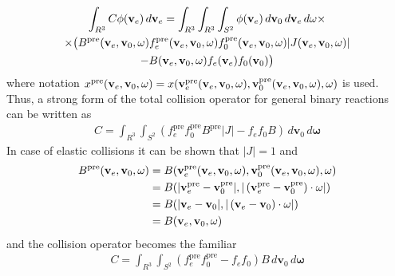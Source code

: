 \documentclass{article}
\newcommand{\diff}[1]{\, d#1}
\newcommand{\vect}[1]{\mathbf{#1}}
\newcommand{\of}[1]{\mleft( #1 \mright)}
\begin{document}
\begin{multline*}
\int_{R^3} C \phi\of{\vect{v}_e} \diff{\vect{v}_e} 
=
\int_{R^3} \int_{R^3} \int_{S^2} 
\phi\of{\vect{v}_e} 
\diff{\vect{v}_0} \diff{\vect{v}_e} \diff{\vect{\omega}}
\times
\\
\times
\big(
B^\text{pre}\of{\vect{v}_e, \vect{v}_0, \vect{\omega}}  
f_e^\text{pre}\of{\vect{v}_e, \vect{v}_0, \vect{\omega}}
f_0^\text{pre}\of{\vect{v}_e, \vect{v}_0, \vect{\omega}} 
|J\of{\vect{v}_e, \vect{v}_0, \vect{\omega}}|
\\
-
B\of{\vect{v}_e, \vect{v}_0, \vect{\omega}} 
f_e\of{\vect{v}_e} f_0\of{\vect{v}_0} 
\big)
\end{multline*}
where notation $x^\text{pre}\of{\vect{v}_e, \vect{v}_0, \vect{\omega}} = x\of{\vect{v}_e^\text{pre} \of{\vect{v}_e, \vect{v}_0, \vect{\omega}}, \vect{v}_0^\text{pre} \of{\vect{v}_e, \vect{v}_0, \vect{\omega}}, \vect{\omega}}$ is used. Thus, a strong form of the total collision operator for general binary reactions can be written as
\begin{align*}
C = 
\int_{R^3} \int_{S^2} 
\left(
f_e^\text{pre}
f_0^\text{pre}
B^\text{pre} 
|J|
-
f_e
f_0
B
\right)
\diff{\vect{v}_0} \diff{\vect{\omega}}
\end{align*}
In case of elastic collisions it can be shown that $|J| = 1$ and
\begin{align*}
B^\text{pre}\of{\vect{v}_e, \vect{v}_0, \vect{\omega}} &=
B\of{\vect{v}_e^\text{pre} \of{\vect{v}_e, \vect{v}_0, \vect{\omega}}, \vect{v}_0^\text{pre} \of{\vect{v}_e, \vect{v}_0, \vect{\omega}}, \vect{\omega}} 
\\
&=
B\of{|\vect{v}_e^\text{pre}- \vect{v}_0^\text{pre}|, |\left(\vect{v}_e^\text{pre}- \vect{v}_0^\text{pre}\right)\cdot\vect{\omega}|} 
\\
&=
B\of{|\vect{v}_e- \vect{v}_0|, |\left(\vect{v}_e- \vect{v}_0\right)\cdot\vect{\omega}|}
\\
&=
B\of{\vect{v}_e, \vect{v}_0, \vect{\omega}} 
\end{align*}
and the collision operator becomes the familiar
\begin{align*}
C = 
\int_{R^3} \int_{S^2} 
\left(
f_e^\text{pre}
f_0^\text{pre}
-
f_e
f_0
\right)
B
\diff{\vect{v}_0} \diff{\vect{\omega}}
\end{align*}
\end{document}
